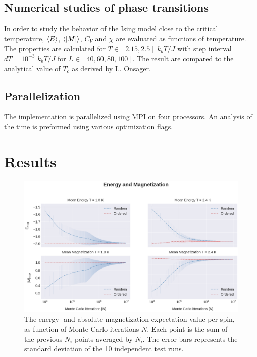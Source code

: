 \documentclass[%
reprint,nofootinbib,
amsmath,amssymb,
aps,
]{revtex4-1}
\begin{document}
\subsection{Numerical studies of phase transitions} \noindent 
In order to study the behavior of the Ising model close to the critical temperature, $\expval{E}$, $\expval{\abs{M}}$, $C_V$ and $\chi$ are evaluated as functions of temperature. The properties are calculated for $T\in[2.15,2.5]$ $k_bT/J$ with step interval $dT = 10^{-3}$ $k_bT/J$ for $L\in[40, 60, 80, 100]$. The result are compared to the analytical value of $T_c$ as derived by L. Onsager. 
 
\subsection{Parallelization}\noindent 
The implementation is parallelized using MPI on four processors. An analysis of the time is preformed using various optimization flags. \\
 
\newpage 
\onecolumngrid
\section{Results} 
\begin{figure}[H] 
	\includegraphics[width = \textwidth]{Figures/4C1.png} 
	\caption{\label{4C11}The energy- and absolute magnetization expectation value per spin, as function of Monte Carlo iterations $N$. Each point is the sum of the previous $N_i$ points averaged by $N_i$. The error bars represents the standard deviation of the 10 independent test runs. \vspace{11mm}}
\end{figure}
\twocolumngrid
\end{document}

